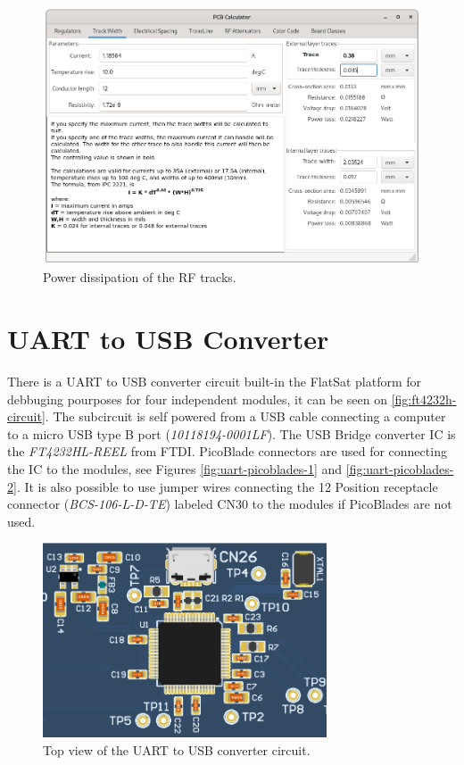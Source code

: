 \begin{figure}[!ht]
    \begin{center}
        \includegraphics[width=\textwidth]{figures/rf-track-width-power.png}
        \caption{Power dissipation of the RF tracks.}
        \label{fig:rf-track-width-power-calc}
    \end{center}
\end{figure}

\section{UART to USB Converter}

There is a UART to USB converter circuit built-in the FlatSat platform for debbuging pourposes for four independent modules, it can be seen on \autoref{fig:ft4232h-circuit}. The subcircuit is self powered from a USB cable connecting a computer to a micro USB type B port (\textit{10118194-0001LF}). The USB Bridge converter IC is the \textit{FT4232HL-REEL} from FTDI. PicoBlade connectors are used for connecting the IC to the modules, see Figures \ref{fig:uart-picoblades-1} and \ref{fig:uart-picoblades-2}. It is also possible to use jumper wires connecting the 12 Position receptacle connector (\textit{BCS-106-L-D-TE}) labeled CN30 to the modules if PicoBlades are not used.

\begin{figure}[!ht]
    \begin{center}
        \includegraphics[width=0.75\textwidth]{figures/ft4232h_circuit.png}
        \caption{Top view of the UART to USB converter circuit.}
        \label{fig:ft4232h-circuit}
    \end{center}
\end{figure}

